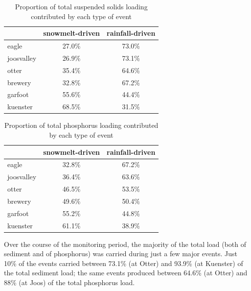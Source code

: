 \documentclass[12pt]{article}
\begin{document}
\begin{table}[ht]
\begin{center}
\begin{tabular}{lcc}
  & snowmelt-driven & rainfall-driven \\ 
  \hline
eagle & 27.0\% & 73.0\% \\ 
  joosvalley & 26.9\% & 73.1\% \\ 
  otter & 35.4\% & 64.6\% \\ 
  brewery & 32.8\% & 67.2\% \\ 
  garfoot & 55.6\% & 44.4\% \\ 
  kuenster & 68.5\% & 31.5\% \\ 
  \end{tabular}
\caption{Proportion of total suspended solids loading contributed by each type of event}
\label{tab:stot}
\end{center}
\end{table}
\begin{table}[ht]
\begin{center}
\begin{tabular}{lcc}
  & snowmelt-driven & rainfall-driven \\ 
  \hline
eagle & 32.8\% & 67.2\% \\ 
  joosvalley & 36.4\% & 63.6\% \\ 
  otter & 46.5\% & 53.5\% \\ 
  brewery & 49.6\% & 50.4\% \\ 
  garfoot & 55.2\% & 44.8\% \\ 
  kuenster & 61.1\% & 38.9\% \\ 
  \end{tabular}
\caption{Proportion of total phosphorus loading contributed by each type of event}
\label{tab:ptot}
\end{center}
\end{table}
Over the course of the monitoring period, the majority of the total load (both of sediment and of phosphorus) was carried during just a few major events. Just 10\% of the events carried between 73.1\% (at Otter) and 93.9\% (at Kuenster) of the total sediment load; the same events produced between 64.6\% (at Otter) and 88\% (at Joos) of the total phosphorus load.\\
\end{document}
